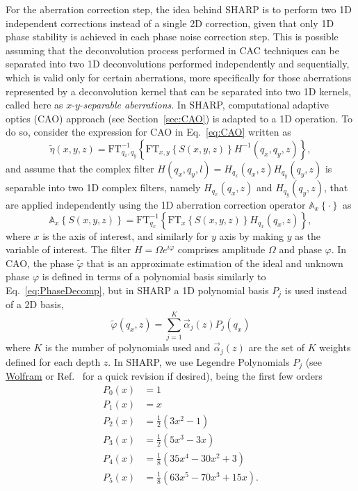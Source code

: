For the aberration correction step, the idea behind SHARP is to perform two 1D independent corrections instead of a single 2D correction, given that only 1D phase stability is achieved in each phase noise correction step. This is possible assuming that the deconvolution process performed in CAC techniques can be separated into two 1D deconvolutions performed independently and sequentially, which is valid only for certain aberrations, more specifically for those aberrations represented by a deconvolution kernel that can be separated into two 1D kernels, called here as $x$-$y$-\textit{separable aberrations}. In SHARP, computational adaptive optics (CAO) approach (see Section~\ref{sec:CAO}) is adapted to a 1D operation. To do so, consider the expression for CAO in Eq.~\eqref{eq:CAO} written as
\begin{equation}
    \tilde{\eta}(x,y,z) = \text{FT}^{-1}_{q_x,q_y}\left\{\text{FT}_{x,y}\left\{S(x,y,z)\right\}H^{-1}(q_x,q_y,z)\right\},
\end{equation}
and assume that the complex filter $H(q_x,q_y,l)=H_{q_x}(q_x,z)H_{q_y}(q_y,z)$ is separable into two 1D complex filters, namely $H_{q_x}(q_x,z)$ and $H_{q_y}(q_y,z)$, that are applied independently using the 1D aberration correction operator $\mathbb{A}_x\left\{\cdot\right\}$ as
\begin{equation}
    \mathbb{A}_x\left\{S(x,y,z)\right\} = \text{FT}^{-1}_{q_x}\left\{\text{FT}_{x}\left\{S(x,y,z)\right\}H_{q_x}(q_x,z)\right\},
\end{equation}
where $x$ is the axis of interest, and similarly for $y$ axis by making $y$ as the variable of interest. The filter $H = \Omega e^{i\varphi}$ comprises amplitude $\Omega$ and phase $\varphi$. In CAO, the phase $\tilde{\varphi}$ that is an approximate estimation of the ideal and unknown phase $\varphi$ is defined in terms of a polynomial basis similarly to Eq.~\eqref{eq:PhaseDecomp}, but in SHARP a 1D polynomial basis $P_j$ is used instead of a 2D basis,
\begin{equation}
    \tilde{\varphi}(q_x,z) = \sum_{j=1}^K\vec{\alpha}_j(z)P_j(q_x)
\end{equation}
where $K$ is the number of polynomials used and $\vec{\alpha}_j(z)$ are the set of $K$ weights defined for each depth $z$. In SHARP, we use Legendre Polynomials $P_j$ (see \href{https://mathworld.wolfram.com/LegendrePolynomial.html}{Wolfram} or Ref.~\cite{Arfken2013_Legendre} for a quick revision if desired), being the first few orders
\begin{align*}
    P_0(x) &= 1 \\
    P_1(x) &= x \\
    P_2(x) &= \frac{1}{2}(3x^2 - 1) \\
    P_3(x) &= \frac{1}{2}(5x^3 - 3x) \\
    P_4(x) &= \frac{1}{8}(35x^4 - 30x^2 + 3) \\
    P_5(x) &= \frac{1}{8}(63x^5 - 70x^3 + 15x).
\end{align*}


